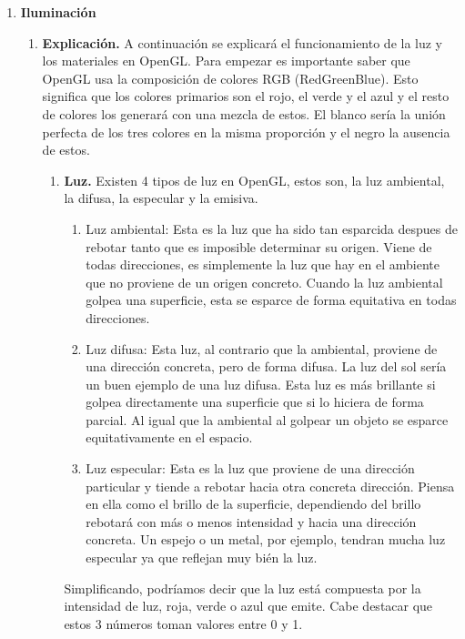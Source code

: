 \documentclass[12pt,a4paper]{article}
\begin{document}
\begin{enumerate}
\item \textbf{Iluminación}\newline
\begin{enumerate}
\item \textbf{Explicación.}
A continuación se explicará el funcionamiento de la luz y los materiales en OpenGL. Para empezar es importante saber que OpenGL usa la composición de colores RGB (RedGreenBlue). Esto significa que los colores primarios son el rojo, el verde y el azul y el resto de colores los generará con una mezcla de estos. El blanco sería la unión perfecta de los tres colores en la misma proporción y el negro la ausencia de estos.\newline
\begin{enumerate}
\item \textbf{Luz.}
Existen 4 tipos de luz en OpenGL, estos son, la luz ambiental, la difusa, la especular y la emisiva.
\begin{enumerate}
\item{Luz ambiental:}
Esta es la luz que ha sido tan esparcida despues de rebotar tanto que es imposible determinar su origen. Viene de todas direcciones, es simplemente la luz que hay en el ambiente que no proviene de un origen concreto.\newline
Cuando la luz ambiental golpea una superficie, esta se esparce de forma equitativa en todas direcciones.
\item{Luz difusa:}
Esta luz, al contrario que la ambiental, proviene de una dirección concreta, pero de forma difusa. La luz del sol sería un buen ejemplo de una luz difusa.\newline
Esta luz es más brillante si golpea directamente una superficie que si lo hiciera de forma parcial. Al igual que la ambiental al golpear un objeto se esparce equitativamente en el espacio.
\item{Luz especular:}
Esta es la luz que proviene de una dirección particular y tiende a rebotar hacia otra concreta dirección. Piensa en ella como el brillo de la superficie, dependiendo del brillo rebotará con más o menos intensidad y hacia una dirección concreta. Un espejo o un metal, por ejemplo, tendran mucha luz especular ya que reflejan muy bién la luz.
\end{enumerate}
Simplificando, podríamos decir que la luz está compuesta por la intensidad de luz, roja, verde o azul que emite. Cabe destacar que estos 3 números toman valores entre 0 y 1.


\end{enumerate}
\end{enumerate}
\end{enumerate}
\end{document}
